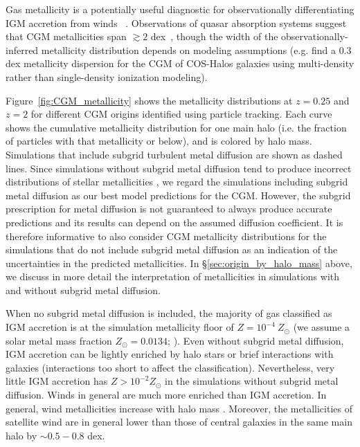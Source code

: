 \documentclass[fleqn,usenatbib]{mnras}
\begin{document}
Gas metallicity is a potentially useful diagnostic for observationally differentiating IGM accretion from winds ~\citep[e.g.][]{Lehner2013,Quiret2016,Hafen2016}. 
Observations of quasar absorption systems suggest that CGM metallicities span $\gtrsim 2$ dex~\citep[e.g.][]{Wotta2016,Prochaska2017}, though the width of the observationally-inferred metallicity distribution depends on modeling assumptions (e.g. \cite{Stern2016} find a $0.3$ dex metallicity dispersion  for the CGM of COS-Halos galaxies using multi-density rather than single-density ionization modeling). 

Figure~\ref{fig:CGM_metallicity} shows the metallicity distributions at $z=0.25$ and $z=2$ for different CGM origins identified using particle tracking. 
Each curve shows the cumulative metallicity distribution for one main halo (i.e. the fraction of particles with that metallicity or below), and is colored by halo mass.
Simulations that include subgrid turbulent metal diffusion are shown as dashed lines. 
Since simulations without subgrid metal diffusion tend to produce incorrect distributions of stellar metallicities \citep[][]{Escala2018}, we regard the simulations including subgrid metal diffusion as our best model predictions for the CGM.
However, the subgrid prescription for metal diffusion is not guaranteed to always produce accurate predictions and its results can depend on the assumed diffusion coefficient. 
It is therefore informative to also consider CGM metallicity distributions for the simulations that do not include subgrid metal diffusion as an indication of the uncertainties in the predicted metallicities. 
In \S \ref{sec:origin_by_halo_mass} above, we discuss in more detail the interpretation of metallicities in simulations with and without subgrid metal diffusion. 
 
When no subgrid metal diffusion is included, the majority of gas classified as IGM accretion is at the simulation metallicity floor of $Z=10^{-4}~Z_\odot$ (we assume a solar metal mass fraction $Z_\odot = 0.0134$; \citealt{Asplund2010}). 
Even without subgrid metal diffusion, IGM accretion can be lightly enriched by halo stars or brief interactions with galaxies (interactions too short to affect the classification). 
Nevertheless, very little IGM accretion has $Z>10^{-2}Z_\odot$ in the simulations without subgrid metal diffusion.
Winds in general are much more enriched than IGM accretion. 
In general, wind metallicities increase with halo mass \citep[as expected from the mass-metallicity relation and the scaling of wind metallicity with ISM metallicity, e.g.][]{Ma2015, Muratov2016}. 
Moreover, the metallicities of satellite wind are in general lower than those of central galaxies in the same main halo by $\sim0.5 - 0.8$ dex.
\end{document}
